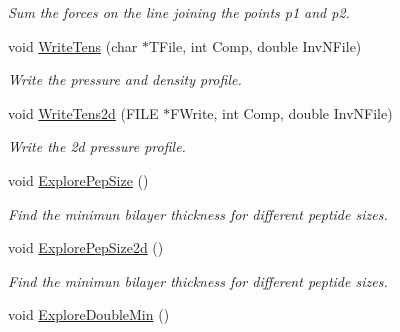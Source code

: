 \begin{DoxyCompactItemize}
\begin{DoxyCompactList}\small\item\em Sum the forces on the line joining the points p1 and p2. \end{DoxyCompactList}\item 
void \hyperlink{classForces_a0bd0430e9512fea0edf8d3cc157f6e7f}{Write\+Tens} (char $\ast$T\+File, int Comp, double Inv\+N\+File)\hypertarget{classForces_a0bd0430e9512fea0edf8d3cc157f6e7f}{}\label{classForces_a0bd0430e9512fea0edf8d3cc157f6e7f}

\begin{DoxyCompactList}\small\item\em Write the pressure and density profile. \end{DoxyCompactList}\item 
void \hyperlink{classForces_a7b39177dbabd51bb886537f9674160ba}{Write\+Tens2d} (F\+I\+LE $\ast$F\+Write, int Comp, double Inv\+N\+File)\hypertarget{classForces_a7b39177dbabd51bb886537f9674160ba}{}\label{classForces_a7b39177dbabd51bb886537f9674160ba}

\begin{DoxyCompactList}\small\item\em Write the 2d pressure profile. \end{DoxyCompactList}\item 
void \hyperlink{classForces_a49654bba62557156b6599f4875484078}{Explore\+Pep\+Size} ()\hypertarget{classForces_a49654bba62557156b6599f4875484078}{}\label{classForces_a49654bba62557156b6599f4875484078}

\begin{DoxyCompactList}\small\item\em Find the minimun bilayer thickness for different peptide sizes. \end{DoxyCompactList}\item 
void \hyperlink{classForces_a9ebbcc00e2ef112a3739e90118698f80}{Explore\+Pep\+Size2d} ()\hypertarget{classForces_a9ebbcc00e2ef112a3739e90118698f80}{}\label{classForces_a9ebbcc00e2ef112a3739e90118698f80}

\begin{DoxyCompactList}\small\item\em Find the minimun bilayer thickness for different peptide sizes. \end{DoxyCompactList}\item 
void \hyperlink{classForces_a3efc71eff5d768421c05dc9f9ef801d1}{Explore\+Double\+Min} ()\hypertarget{classForces_a3efc71eff5d768421c05dc9f9ef801d1}{}\label{classForces_a3efc71eff5d768421c05dc9f9ef801d1}


\end{DoxyCompactItemize}
